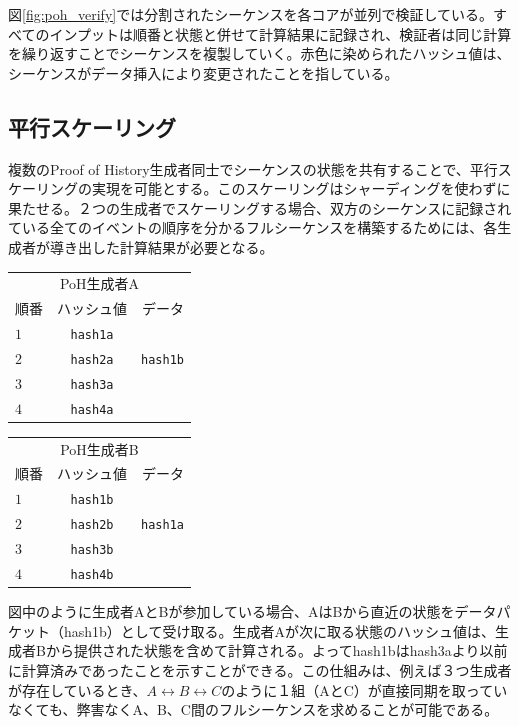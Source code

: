 \documentclass[12pt]{ltjsarticle}
\begin{document}
図\ref{fig:poh_verify}では分割されたシーケンスを各コアが並列で検証している。すべてのインプットは順番と状態と併せて計算結果に記録され、検証者は同じ計算を繰り返すことでシーケンスを複製していく。赤色に染められたハッシュ値は、シーケンスがデータ挿入により変更されたことを指している。

\subsection{平行スケーリング}\label{poh:scale}
複数のProof of History生成者同士でシーケンスの状態を共有することで、平行スケーリングの実現を可能とする。このスケーリングはシャーディングを使わずに果たせる。２つの生成者でスケーリングする場合、双方のシーケンスに記録されている全てのイベントの順序を分かるフルシーケンスを構築するためには、各生成者が導き出した計算結果が必要となる。

\begin{center}
  \begin{tabular}{|l c r|}

  \hline
    \multicolumn{3}{|c|}{PoH生成者A} \\
    順番  & ハッシュ値 & データ \\ \hline
    $1$ & \texttt{hash1a} & \\ 
    $2$ & \texttt{hash2a} & \texttt{hash1b} \\ 
    $3$ & \texttt{hash3a} & \\ 
    $4$ & \texttt{hash4a} & \\
    \hline
    \end{tabular}
  \begin{tabular}{| l  c  r |}
  \hline
    \multicolumn{3}{|c|}{PoH生成者B} \\
    順番  & ハッシュ値 & データ \\ \hline
    $1$ & \texttt{hash1b} & \\ 
    $2$ & \texttt{hash2b} & \texttt{hash1a} \\ 
    $3$ & \texttt{hash3b} & \\ 
    $4$ & \texttt{hash4b} & \\
    \hline
    \end{tabular}
\end{center}

図中のように生成者AとBが参加している場合、AはBから直近の状態をデータパケット（hash1b）として受け取る。生成者Aが次に取る状態のハッシュ値は、生成者Bから提供された状態を含めて計算される。よってhash1bはhash3aより以前に計算済みであったことを示すことができる。この仕組みは、例えば３つ生成者が存在しているとき、\(A \leftrightarrow B \leftrightarrow C\)のように１組（AとC）が直接同期を取っていなくても、弊害なくA、B、C間のフルシーケンスを求めることが可能である。
\end{document}
